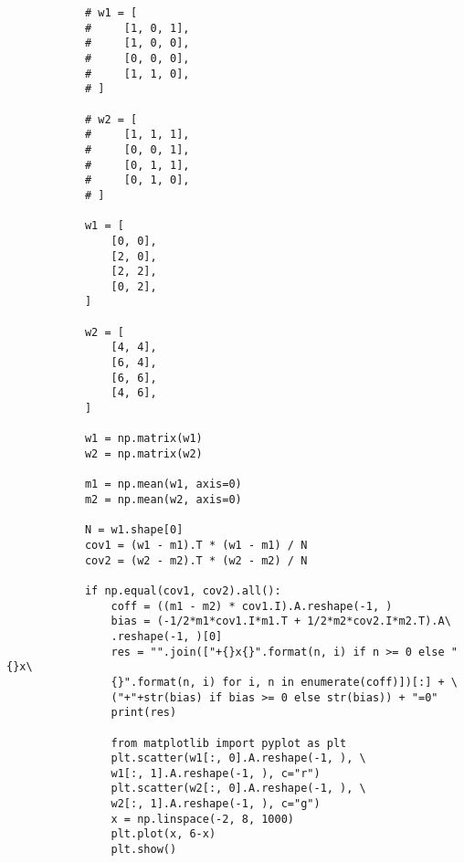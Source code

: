 \documentclass{article}
\begin{document}
\begin{CJK*}{UTF8}{gbsn}
\begin{lstlisting}
            # w1 = [
            #     [1, 0, 1], 
            #     [1, 0, 0], 
            #     [0, 0, 0], 
            #     [1, 1, 0],
            # ]
            
            # w2 = [
            #     [1, 1, 1],
            #     [0, 0, 1],
            #     [0, 1, 1],
            #     [0, 1, 0],
            # ]
            
            w1 = [
                [0, 0],
                [2, 0],
                [2, 2],
                [0, 2],
            ]
            
            w2 = [
                [4, 4],
                [6, 4],
                [6, 6],
                [4, 6],
            ]
            
            w1 = np.matrix(w1)
            w2 = np.matrix(w2)
            
            m1 = np.mean(w1, axis=0)
            m2 = np.mean(w2, axis=0) 
            
            N = w1.shape[0]
            cov1 = (w1 - m1).T * (w1 - m1) / N
            cov2 = (w2 - m2).T * (w2 - m2) / N
            
            if np.equal(cov1, cov2).all():
                coff = ((m1 - m2) * cov1.I).A.reshape(-1, )
                bias = (-1/2*m1*cov1.I*m1.T + 1/2*m2*cov2.I*m2.T).A\
                .reshape(-1, )[0]
                res = "".join(["+{}x{}".format(n, i) if n >= 0 else "{}x\
                {}".format(n, i) for i, n in enumerate(coff)])[:] + \
                ("+"+str(bias) if bias >= 0 else str(bias)) + "=0" 
                print(res)
            
                from matplotlib import pyplot as plt
                plt.scatter(w1[:, 0].A.reshape(-1, ), \
                w1[:, 1].A.reshape(-1, ), c="r")
                plt.scatter(w2[:, 0].A.reshape(-1, ), \
                w2[:, 1].A.reshape(-1, ), c="g")
                x = np.linspace(-2, 8, 1000)
                plt.plot(x, 6-x)
                plt.show()
            
        \end{lstlisting}

\end{CJK*}
\end{document}
